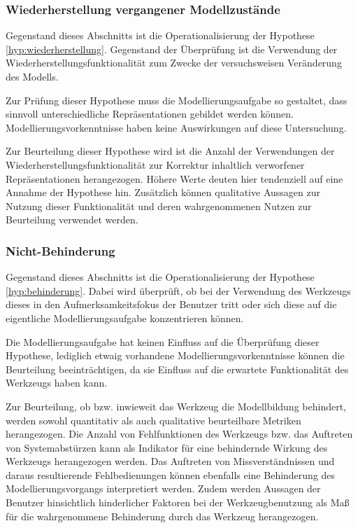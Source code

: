 
\subsubsection{Wiederherstellung vergangener Modellzustände} %
\label{ssub:wiederherstellung_vergangener_modellzustände}

Gegenstand dieses Abschnitts ist die Operationalisierung der Hypothese \ref{hyp:wiederherstellung}. Gegenstand der Überprüfung ist die Verwendung der Wiederherstellungsfunktionalität zum Zwecke der versuchsweisen Veränderung des Modells.

Zur Prüfung dieser Hypothese muss die Modellierungsaufgabe so gestaltet, dass sinnvoll unterschiedliche Repräsentationen gebildet werden können. Modellierungsvorkenntnisse haben keine Auswirkungen auf diese Untersuchung.

Zur Beurteilung dieser Hypothese wird ist die Anzahl der Verwendungen der Wiederherstellungsfunktionalität zur Korrektur inhaltlich verworfener Repräsentationen herangezogen. Höhere Werte deuten hier tendenziell auf eine Annahme der Hypothese hin. Zusätzlich können qualitative Aussagen zur Nutzung dieser Funktionalität und deren wahrgenommenen Nutzen zur Beurteilung verwendet werden. 


\subsubsection{Nicht-Behinderung} %
\label{ssub:nicht_behinderung}

Gegenstand dieses Abschnitts ist die Operationalisierung der Hypothese \ref{hyp:behinderung}. Dabei wird überprüft, ob bei der Verwendung des Werkzeugs dieses in den Aufmerksamkeitsfokus der Benutzer tritt oder sich diese auf die eigentliche Modellierungsaufgabe konzentrieren können. 

Die Modellierungsaufgabe hat keinen Einfluss auf die Überprüfung dieser Hypothese, lediglich etwaig vorhandene Modellierungsvorkenntnisse können die Beurteilung beeinträchtigen, da sie Einfluss auf die erwartete Funktionalität des Werkzeugs haben kann.

Zur Beurteilung, ob bzw. inwieweit das Werkzeug die Modellbildung behindert, werden sowohl quantitativ als auch qualitative beurteilbare Metriken herangezogen. Die Anzahl von Fehlfunktionen des Werkzeugs bzw. das Auftreten von Systemabstürzen kann als Indikator für eine behindernde Wirkung des Werkzeugs herangezogen werden. Das Auftreten von Missverständnissen und daraus resultierende Fehlbedienungen können ebenfalls eine Behinderung des Modellierungsvorgangs interpretiert werden. Zudem werden Aussagen der Benutzer hinsichtlich hinderlicher Faktoren bei der Werkzeugbenutzung als Maß für die wahrgenommene Behinderung durch das Werkzeug herangezogen.

